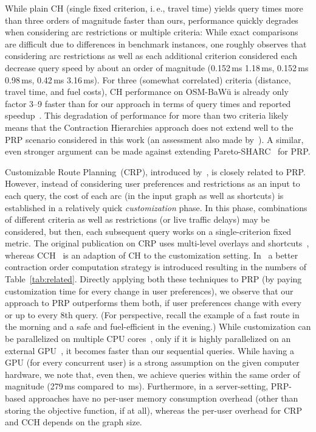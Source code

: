 \documentclass{sig-alternate}
\newcommand{\ie}{i.\,e.\xspace}
\begin{document}
While plain CH (single fixed criterion, \ie, travel time) yields query times more than three orders of magnitude faster than ours, performance quickly degrades when considering arc restrictions or multiple criteria: While exact comparisons are difficult due to differences in benchmark instances, one roughly observes that considering arc restrictions as well as each additional criterion considered each decrease query speed by about an order of magnitude (0.152\,ms  1.18\,ms, 0.152\,ms  0.98\,ms, 0.42\,ms  3.16\,ms). For three (somewhat correlated) criteria (distance, travel time, and fuel costs), CH performance on OSM-BaWü is already only factor 3--9 faster than for our approach in terms of query times and reported speedup~\cite{fs-pcchm-13}. 
This degradation of performance for more than two criteria likely means that the Contraction Hierarchies approach does not extend well to the PRP scenario considered in this work (an assessment also made by~\cite{fns-opca-14}). A similar, even stronger argument can be made against extending Pareto-SHARC~\cite{dw-pps-09} for PRP.


Customizable Route Planning~(CRP), introduced by~\cite{dgpw-crprn-13}, is closely related to PRP. However, instead of considering user preferences and restrictions as an input to each query, the cost of each arc (in the input graph as well as shortcuts) is established in a relatively quick \emph{customization} phase. In this phase, combinations of different criteria as well as restrictions (or live traffic delays) may be considered, but then, each subsequent query works on a single-criterion fixed metric. The original publication on CRP uses multi-level overlays and shortcuts~\cite{dgpw-crprn-13}, whereas CCH~\cite{dsw-cch-sea-14} is an adaption of CH to the customization setting. In~\cite{hs-gbpo-15} a better contraction order computation strategy is introduced resulting in the numbers of Table~\ref{tab:related}.  Directly applying both these techniques to PRP (by paying customization time for every change in user preferences), we observe that our approach to PRP outperforms them both, if user preferences change with every or up to every 8th query. (For perspective, recall the example of a fast route in the morning and a safe and fuel-efficient in the evening.)  
While customization can be parallelized on multiple CPU cores~\cite{dgpw-crprn-13,dsw-cch-sea-14}, only if it is highly parallelized on an external GPU~\cite{dkw-cddgp-14}, it becomes faster than our sequential queries. 
While having a GPU (for every concurrent user) is a strong assumption on the given computer hardware, we note that, even then, we achieve queries within the same order of magnitude (279\,ms compared to \,ms).
Furthermore, in a server-setting, PRP-based approaches have no per-user memory consumption overhead (other than storing the objective function, if at all), whereas the per-user overhead for CRP and CCH depends on the graph size.
\end{document}
